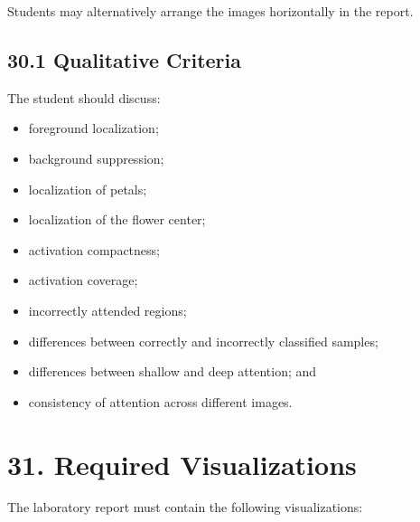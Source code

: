 \documentclass[10pt]{article}
\begin{document}
Students may alternatively arrange the images horizontally in the report.

\subsection*{30.1 Qualitative Criteria}

The student should discuss:

\begin{itemize}

\item foreground localization;

\item background suppression;

\item localization of petals;

\item localization of the flower center;

\item activation compactness;

\item activation coverage;

\item incorrectly attended regions;

\item differences between correctly and incorrectly classified samples;

\item differences between shallow and deep attention; and

\item consistency of attention across different images.

\end{itemize}

\section*{31. Required Visualizations}

The laboratory report must contain the following visualizations:
\end{document}
